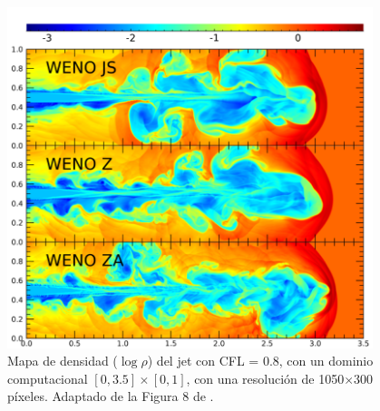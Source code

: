 \documentclass[12pt,a4paper]{book}
\begin{document}
\begin{figure}
    \begin{center}
      \includegraphics[width=0.95\textwidth]{Figuras/Introduccion/jet_ejemplo_2.png}
    \end{center}
    \caption{Mapa de densidad ($\log \rho$) del jet con CFL = 0.8, con un dominio computacional $\left[0, 3.5\right] \times \left[0, 1\right]$, con una resolución de 1050$\times$300 píxeles. Adaptado de la Figura 8 
    de \citet{Seo2021}.}
    \label{fig:jet_ejemplo_2}
\end{figure}
\end{document}
